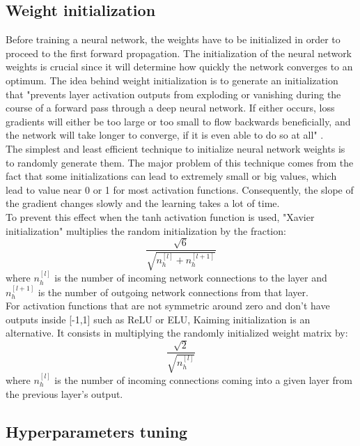 \subsection{Weight initialization}
\label{weight_initialization}
\setlength{\marginparwidth}{3cm}\leavevmode {}Before training a neural network, the weights have to be initialized in order to proceed to the first forward propagation. The initialization of the neural network weights is crucial since it will determine how quickly the network converges to an optimum. The idea behind weight initialization is to generate an initialization that "prevents layer activation outputs from exploding or vanishing during the course of a forward pass through a deep neural network. If either occurs, loss gradients will either be too large or too small to flow backwards beneficially, and the network will take longer to converge, if it is even able to do so at all" \cite{27}.\\
The simplest and least efficient technique to initialize neural network weights is to randomly generate them. The major problem of this technique comes from the fact that some initializations can lead to extremely small or big values, which lead to value near 0 or 1 for most activation functions. Consequently, the slope of the gradient changes slowly and the learning takes a lot of time.\\
To prevent this effect when the tanh activation function is used, "Xavier initialization" multiplies the random initialization by the fraction:
\begin{equation}
\frac{\sqrt{6}}{\sqrt{n_{h}^{[l]}+n_{h}^{[l+1]}}}
\end{equation}
where $n_{h}^{[l]}$ is the number of incoming network connections to the layer and $n_{h}^{[l+1]}$ is the number of outgoing network connections from that layer.\\
For activation functions that are not symmetric around zero and don't have outputs inside [-1,1] such as ReLU or ELU, Kaiming initialization is an alternative. It consists in multiplying the randomly initialized  weight matrix by:
\begin{equation}
\frac{\sqrt{2}}{\sqrt{n_{h}^{[l]}}}
\end{equation} 
where $n_{h}^{[l]}$ is the number of incoming connections coming into a given layer from the previous layer's output.

\subsection{Hyperparameters tuning}

